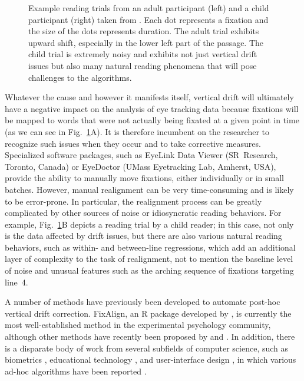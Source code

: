 \documentclass[doc,biblatex]{apa7}
\begin{document}
	\begin{figure}
	\vspace*{2pt}
	\caption{Example reading trials from an adult participant (left) and a child participant (right) taken from \textcite{Pescuma:0000}. Each dot represents a fixation and the size of the dots represents duration. The adult trial exhibits upward shift, especially in the lower left part of the passage. The child trial is extremely noisy and exhibits not just vertical drift issues but also many natural reading phenomena that will pose challenges to the algorithms.}
	\label{fig01}
	\end{figure}

Whatever the cause and however it manifests itself, vertical drift will ultimately have a negative impact on the analysis of eye tracking data because fixations will be mapped to words that were not actually being fixated at a given point in time (as we can see in Fig.~\ref{fig01}A). It is therefore incumbent on the researcher to recognize such issues when they occur and to take corrective measures. Specialized software packages, such as EyeLink Data Viewer (SR~Research, Toronto, Canada) or EyeDoctor (UMass Eyetracking Lab, Amherst, USA), provide the ability to manually move fixations, either individually or in small batches. However, manual realignment can be very time-consuming and is likely to be error-prone. In particular, the realignment process can be greatly complicated by other sources of noise or idiosyncratic reading behaviors. For example, Fig.~\ref{fig01}B depicts a reading trial by a child reader; in this case, not only is the data affected by drift issues, but there are also various natural reading behaviors, such as within- and between-line regressions, which add an additional layer of complexity to the task of realignment, not to mention the baseline level of noise and unusual features such as the arching sequence of fixations targeting line~4.

A number of methods have previously been developed to automate post-hoc vertical drift correction. FixAlign, an R package developed by \textcite{Cohen:2013}, is currently the most well-established method in the experimental psychology community, although other methods have recently been proposed by \textcite{Schroeder:0000} and \textcite{Spakov:2019}. In addition, there is a disparate body of work from several subfields of computer science, such as biometrics \parencite{Abdulin:2015}, educational technology \parencite{Hyrskykari:2006}, and user-interface design \parencite{Beymer:2005}, in which various ad-hoc algorithms have been reported \parencite[see also][]{LimaSanches:2015,Carl:2013,Mishra:2012,MartinezGomez:2012,Yamaya:2017,Palmer:2016,Nussli:2011,Sibert:2000,Lohmeier:2015}.
\end{document}
